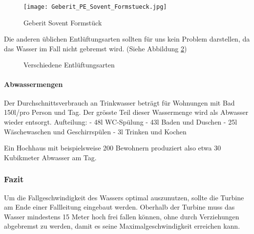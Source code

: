 \begin{figure}[H]
    \centering
    \texttt{[image: Geberit\_PE\_Sovent\_Formstueck.jpg]}
    \caption{Geberit Sovent Formstück \cite{geberit}}
	\label{fig:Sovent}
\end{figure}

Die anderen üblichen Entlüftungsarten sollten für uns kein Problem darstellen, da das Wasser im Fall nicht gebremst wird. (Siehe Abbildung \ref{fig:Entlüftungsarten})

\begin{figure}[H]
\centering
{}\;
\;
\caption{Verschiedene Entlüftungsarten \cite{docplayer}}
\label{fig:Entlüftungsarten}
\end{figure}

\paragraph{Abwassermengen}
Der Durchschnittsverbrauch an Trinkwasser beträgt für Wohnungen mit Bad 150l/pro Person und Tag. Der grösste Teil dieser Wassermenge wird als Abwasser wieder entsorgt. 
\newline
Aufteilung:
\newline
- 48l \; WC-Spülung
\newline
- 43l \; Baden und Duschen
\newline
- 25l \; Wäschewaschen und Geschirrspülen
\newline
- 3l \;  Trinken und Kochen
\newline
\cite{wohnbau}

Ein Hochhaus mit beispielsweise 200 Bewohnern produziert also etwa 30 Kubikmeter Abwasser am Tag.

\subsubsection{Fazit}
Um die Fallgeschwindigkeit des Wassers optimal auszunutzen, sollte die Turbine am Ende einer Fallleitung eingebaut werden. Oberhalb der Turbine muss das Wasser mindestens 15 Meter hoch frei fallen können, ohne durch Verziehungen abgebremst zu werden, damit es seine Maximalgeschwindigkeit erreichen kann. 


\clearpage 






